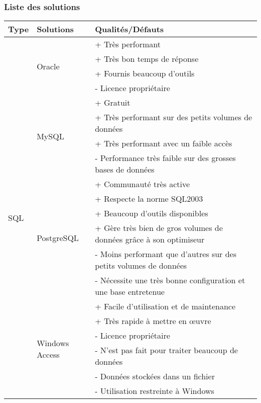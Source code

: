         \subsubsection{Liste des solutions}
        \label{subsubsec:bddsolutions}

        \begin{center}
        \begin{tabular}{|l|l|l|}
            \hline Type & Solutions & Qualités/Défauts \\ \hline
            \multirow{20}{*}{SQL} & \multirow{4}{*}{Oracle} & + Très performant \\
            & & + Très bon temps de réponse \\
            & & + Fournis beaucoup d'outils \\
            & & - Licence propriétaire \\ \cline{2-3}
            & \multirow{4}{*}{MySQL} & + Gratuit \\
            & & + Très performant sur des petits volumes de données \\
            & & + Très performant avec un faible accès \\
            & & - Performance très faible sur des grosses bases de données \\ \cline{2-3}
            & \multirow{6}{*}{PostgreSQL} & + Communauté très active \\
            & & + Respecte la norme SQL2003 \\
            & & + Beaucoup d’outils disponibles \\
            & & + Gère très bien de gros volumes de données grâce à son optimiseur \\
            & & - Moins performant que d’autres sur des petits volumes de données \\
            & & - Nécessite une très bonne configuration et une base entretenue \\ \cline{2-3}
            & \multirow{6}{*}{Windows Access} & + Facile d’utilisation et de maintenance \\
            & & + Très rapide à mettre en œuvre \\
            & & - Licence propriétaire \\
            & & - N’est pas fait pour traiter beaucoup de données \\
            & & - Données stockées dans un fichier \\
            & & - Utilisation restreinte à Windows \\ \hline

\end{tabular}
\end{center}

